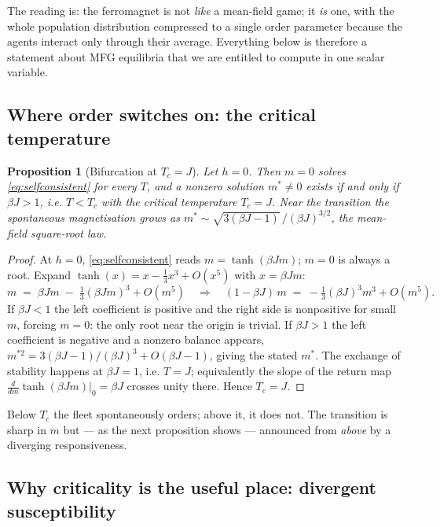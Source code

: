 \documentclass[11pt]{article}
\newtheorem{proposition}{Proposition}
\begin{document}
The reading is: the ferromagnet is not \emph{like} a mean-field game; it \emph{is} one, with the whole
population distribution compressed to a single order parameter because the agents interact only through their
average. Everything below is therefore a statement about MFG equilibria that we are entitled to compute in one
scalar variable.

\subsection{Where order switches on: the critical temperature}

\begin{proposition}[Bifurcation at $T_c=J$]
\label{prop:tc}
Let $h=0$. Then $m=0$ solves \eqref{eq:selfconsistent} for every $T$, and a nonzero solution $m^{*}\neq0$
exists if and only if $\beta J>1$, i.e. $T<T_c$ with the critical temperature $T_c=J$. Near the transition the
spontaneous magnetisation grows as $m^{*}\sim\sqrt{3(\beta J-1)}\,/(\beta J)^{3/2}$, the mean-field square-root
law.
\end{proposition}

\begin{proof}
At $h=0$, \eqref{eq:selfconsistent} reads $m=\tanh(\beta J m)$; $m=0$ is always a root. Expand
$\tanh(x)=x-\tfrac13 x^3+O(x^5)$ with $x=\beta J m$:
\[
m \;=\; \beta J m \;-\; \tfrac13(\beta J m)^3 + O(m^5)
\quad\Longrightarrow\quad
(1-\beta J)\,m \;=\; -\tfrac13(\beta J)^3 m^3 + O(m^5).
\]
If $\beta J<1$ the left coefficient is positive and the right side is nonpositive for small $m$, forcing $m=0$:
the only root near the origin is trivial. If $\beta J>1$ the left coefficient is negative and a nonzero balance
appears, $m^{*2}=3(\beta J-1)/(\beta J)^3+O(\beta J-1)$, giving the stated $m^{*}$. The exchange of stability
happens at $\beta J=1$, i.e. $T=J$; equivalently the slope of the return map $\tfrac{d}{dm}\tanh(\beta Jm)|_{0}
=\beta J$ crosses unity there. Hence $T_c=J$.
\end{proof}

Below $T_c$ the fleet spontaneously orders; above it, it does not. The transition is sharp in $m$ but --- as the
next proposition shows --- announced from \emph{above} by a diverging responsiveness.

\subsection{Why criticality is the useful place: divergent susceptibility}
\end{document}

